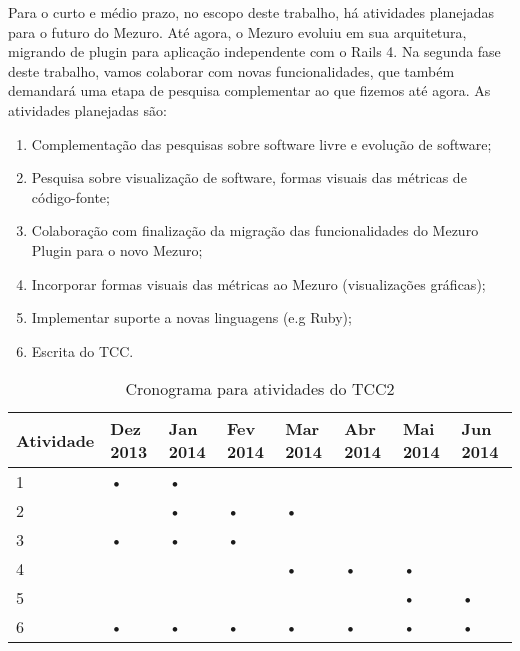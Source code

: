 Para o curto e médio prazo, no escopo deste trabalho, há atividades planejadas para o futuro do Mezuro. Até agora, o Mezuro evoluiu em sua arquitetura, migrando de plugin para aplicação independente com o Rails 4. Na segunda fase deste trabalho, vamos colaborar com novas funcionalidades, que também demandará uma etapa de pesquisa complementar ao que fizemos até agora. As atividades planejadas são:

\begin{enumerate}
\item Complementação das pesquisas sobre software livre e evolução de software;
\item Pesquisa sobre visualização de software, formas visuais das métricas de código-fonte;
\item Colaboração com finalização da migração das funcionalidades do Mezuro Plugin para o novo Mezuro;
\item Incorporar formas visuais das métricas ao Mezuro (visualizações gráficas);
\item Implementar suporte a novas linguagens (e.g Ruby);
\item Escrita do TCC.
\end{enumerate}

\begin{table}[H]
\begin{center}
    \begin{tabular}{ | l | l | l | l | l | l | l | l |}
    \hline
    Atividade & Dez 2013 & Jan 2014 & Fev 2014 & Mar 2014 & Abr 2014 & Mai 2014 & Jun 2014 \\ \hline
    1 & • & • &   &   &   &   &   \\ \hline
    2 &   & • & • & • &   &   &   \\ \hline
    3 & • & • & • &   &   &   &   \\ \hline
    4 &   &   &   & • & • & • &   \\ \hline
    5 &   &   &   &   &   & • & • \\ \hline
    6 & • & • & • & • & • & • & • \\ \hline
    \end{tabular}
    \caption{Cronograma para atividades do TCC2}
    \label{tab-cronograma}
\end{center}
\end{table}

